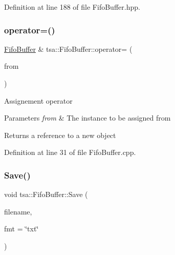 Definition at line 188 of file Fifo\+Buffer.\+hpp.

\mbox{\label{classtsa_1_1_fifo_buffer_ad3c89a0f4aa3e475e136ec8c47f2165e}} 
\subsubsection{\texorpdfstring{operator=()}{operator=()}}
{\footnotesize\ttfamily \hyperlink{classtsa_1_1_fifo_buffer}{Fifo\+Buffer} \& tsa\+::\+Fifo\+Buffer\+::operator= (\begin{DoxyParamCaption}\item[{const \hyperlink{classtsa_1_1_fifo_buffer}{Fifo\+Buffer} \&}]{from }\end{DoxyParamCaption})}

Assignement operator


\begin{DoxyParams}{Parameters}
{\em from} & The instance to be assigned from\\
\hline
\end{DoxyParams}
\begin{DoxyReturn}{Returns}
a reference to a new object 
\end{DoxyReturn}


Definition at line 31 of file Fifo\+Buffer.\+cpp.

\mbox{\label{classtsa_1_1_fifo_buffer_aeb760c1c71644dc850395b838e47bcfb}} 
\subsubsection{\texorpdfstring{Save()}{Save()}}
{\footnotesize\ttfamily void tsa\+::\+Fifo\+Buffer\+::\+Save (\begin{DoxyParamCaption}\item[{const char $\ast$}]{filename,  }\item[{const char $\ast$}]{fmt = {\ttfamily \char`\"{}txt\char`\"{}} }\end{DoxyParamCaption})\hspace{0.3cm}{\ttfamily [inline]}}



